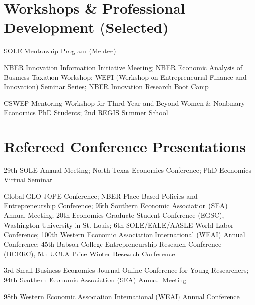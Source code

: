 \documentclass[12pt,letterpaper]{report}
\begin{document}
\section*{Workshops \& Professional Development (Selected)}
{\selectfont
\begin{tablist}
  \item[2026] \tab{}SOLE Mentorship Program (Mentee)

  \item[2025] \tab{}NBER Innovation Information Initiative Meeting; NBER Economic Analysis of Business Taxation Workshop; WEFI (Workshop on Entrepreneurial Finance and Innovation) Seminar Series; NBER Innovation Research Boot Camp

  \item[2024] \tab{}CSWEP Mentoring Workshop for Third-Year and Beyond Women \& Nonbinary Economics PhD Students; 2nd REGIS Summer School
\end{tablist}
}

\section*{Refereed Conference Presentations}
{\selectfont
\begin{tablist}
  \item[2026] \tab{}29th SOLE Annual Meeting; North Texas Economics Conference; PhD-Economics Virtual Seminar

  \item[2025] \tab{}Global GLO-JOPE Conference; NBER Place-Based Policies and Entrepreneurship Conference; 95th Southern Economic Association (SEA) Annual Meeting; 20th Economics Graduate Student Conference (EGSC), Washington University in St. Louis; 6th SOLE/EALE/AASLE World Labor Conference; 100th Western Economic Association International (WEAI) Annual Conference; 45th Babson College Entrepreneurship Research Conference (BCERC); 5th UCLA Price Winter Research Conference

  \item[2024] \tab{}3rd Small Business Economics Journal Online Conference for Young Researchers; 94th Southern Economic Association (SEA) Annual Meeting

  \item[2023] \tab{}98th Western Economic Association International (WEAI) Annual Conference
\end{tablist}
}
\end{document}
